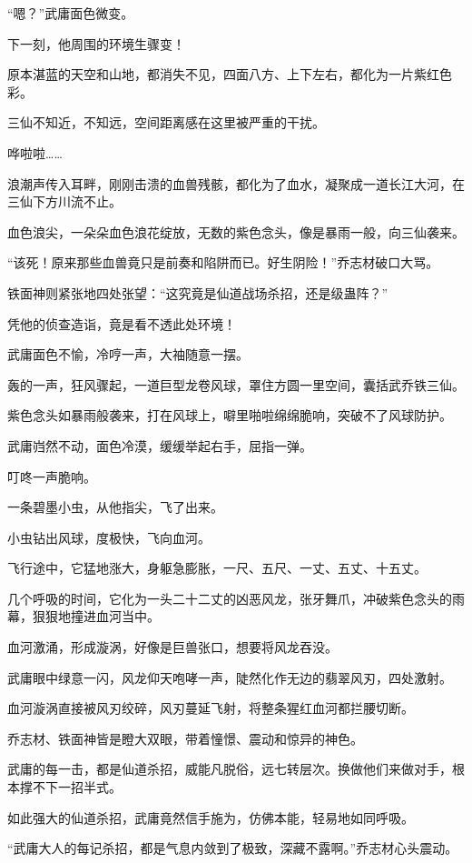 \begin{this_body}
“嗯？”武庸面色微变。

下一刻，他周围的环境生骤变！

原本湛蓝的天空和山地，都消失不见，四面八方、上下左右，都化为一片紫红色彩。

三仙不知近，不知远，空间距离感在这里被严重的干扰。

哗啦啦……

浪潮声传入耳畔，刚刚击溃的血兽残骸，都化为了血水，凝聚成一道长江大河，在三仙下方川流不止。

血色浪尖，一朵朵血色浪花绽放，无数的紫色念头，像是暴雨一般，向三仙袭来。

“该死！原来那些血兽竟只是前奏和陷阱而已。好生阴险！”乔志材破口大骂。

铁面神则紧张地四处张望：“这究竟是仙道战场杀招，还是级蛊阵？”

凭他的侦查造诣，竟是看不透此处环境！

武庸面色不愉，冷哼一声，大袖随意一摆。

轰的一声，狂风骤起，一道巨型龙卷风球，罩住方圆一里空间，囊括武乔铁三仙。

紫色念头如暴雨般袭来，打在风球上，噼里啪啦绵绵脆响，突破不了风球防护。

武庸岿然不动，面色冷漠，缓缓举起右手，屈指一弹。

叮咚一声脆响。

一条碧墨小虫，从他指尖，飞了出来。

小虫钻出风球，度极快，飞向血河。

飞行途中，它猛地涨大，身躯急膨胀，一尺、五尺、一丈、五丈、十五丈。

几个呼吸的时间，它化为一头二十二丈的凶恶风龙，张牙舞爪，冲破紫色念头的雨幕，狠狠地撞进血河当中。

血河激涌，形成漩涡，好像是巨兽张口，想要将风龙吞没。

武庸眼中绿意一闪，风龙仰天咆哮一声，陡然化作无边的翡翠风刃，四处激射。

血河漩涡直接被风刃绞碎，风刃蔓延飞射，将整条猩红血河都拦腰切断。

乔志材、铁面神皆是瞪大双眼，带着憧憬、震动和惊异的神色。

武庸的每一击，都是仙道杀招，威能凡脱俗，远七转层次。换做他们来做对手，根本撑不下一招半式。

如此强大的仙道杀招，武庸竟然信手施为，仿佛本能，轻易地如同呼吸。

“武庸大人的每记杀招，都是气息内敛到了极致，深藏不露啊。”乔志材心头震动。


\end{this_body}
